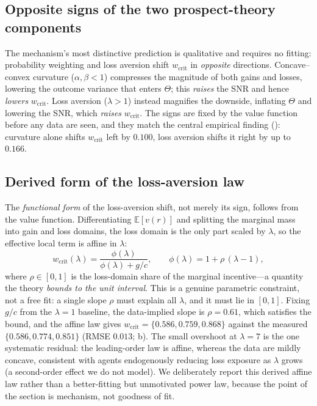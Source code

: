 \documentclass[11pt]{article}
\newcommand{\wcrit}{w_{\mathrm{crit}}}
\begin{document}
\subsection{Opposite signs of the two prospect-theory components}
The mechanism's most distinctive prediction is qualitative and requires no
fitting: probability weighting and loss aversion shift $\wcrit$ in
\emph{opposite} directions. Concave--convex curvature ($\alpha,\beta<1$)
compresses the magnitude of both gains and losses, lowering the outcome
variance that enters $\Theta$; this \emph{raises} the SNR and hence
\emph{lowers} $\wcrit$. Loss aversion ($\lambda>1$) instead magnifies the
downside, inflating $\Theta$ and lowering the SNR, which \emph{raises}
$\wcrit$. The signs are fixed by the value function before any data are
seen, and they match the central empirical finding
(): curvature alone shifts $\wcrit$ left by
$0.100$, loss aversion shifts it right by up to $0.166$.

\subsection{Derived form of the loss-aversion law}
The \emph{functional form} of the loss-aversion shift, not merely its sign,
follows from the value function. Differentiating $\mathbb{E}[v(r)]$ and
splitting the marginal mass into gain and loss domains, the loss domain is
the only part scaled by $\lambda$, so the effective local term is affine in
$\lambda$:
\begin{equation}
  \wcrit(\lambda)=\frac{\phi(\lambda)}{\phi(\lambda)+g/c},
  \qquad \phi(\lambda)=1+\rho\,(\lambda-1),
  \label{eq:wcrit_lambda}
\end{equation}
where $\rho\in[0,1]$ is the loss-domain share of the marginal incentive---a
quantity the theory \emph{bounds to the unit interval}. This is a genuine
parametric constraint, not a free fit: a single slope $\rho$ must explain
all $\lambda$, and it must lie in $[0,1]$. Fixing $g/c$ from the
$\lambda{=}1$ baseline, the data-implied slope is $\rho=0.61$, which
satisfies the bound, and the affine law gives
$\wcrit=\{0.586,0.759,0.868\}$ against the measured
$\{0.586,0.774,0.851\}$ (RMSE $0.013$; b). The small
overshoot at $\lambda{=}7$ is the one systematic residual: the leading-order
law is affine, whereas the data are mildly concave, consistent with agents
endogenously reducing loss exposure as $\lambda$ grows (a second-order
effect we do not model). We deliberately report this derived affine law
rather than a better-fitting but unmotivated power law, because the point of
the section is mechanism, not goodness of fit.
\end{document}
